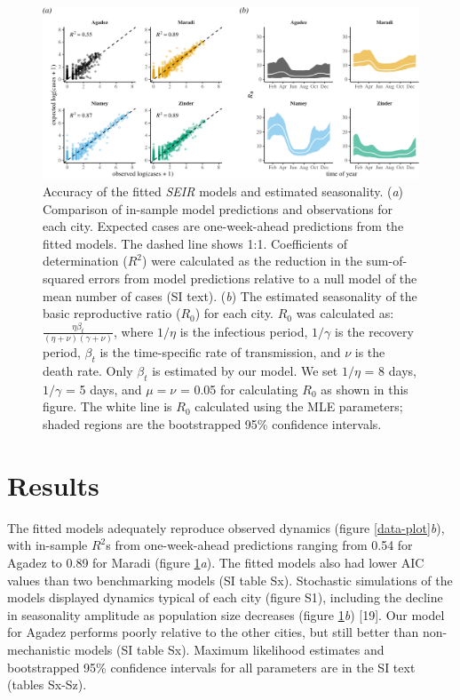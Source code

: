 \documentclass[3p]{elsarticle} %
\makeatletter
\def\maxwidth{\ifdim\Gin@nat@width>\linewidth\linewidth
\else\Gin@nat@width\fi}
\let\Oldincludegraphics\includegraphics
\renewcommand{\includegraphics}[1]{\Oldincludegraphics[width=\maxwidth]{#1}}
\makeatother
\begin{document}
\begin{figure}
\centering
\includegraphics{measles-ews-manuscript_files/figure-latex/scatters-r0-1.pdf}
\caption{Accuracy of the fitted \emph{SEIR} models and estimated
seasonality. (\emph{a}) Comparison of in-sample model predictions and
observations for each city. Expected cases are one-week-ahead
predictions from the fitted models. The dashed line shows 1:1.
Coefficients of determination (\(R^2\)) were calculated as the reduction
in the sum-of-squared errors from model predictions relative to a null
model of the mean number of cases (SI text). (\emph{b}) The estimated
seasonality of the basic reproductive ratio (\(R_0\)) for each city.
\(R_0\) was calculated as:
\(\frac{\eta \beta_t}{(\eta+\nu)(\gamma+\nu)}\), where \(1/\eta\) is the
infectious period, \(1/\gamma\) is the recovery period, \(\beta_t\) is
the time-specific rate of transmission, and \(\nu\) is the death rate.
Only \(\beta_t\) is estimated by our model. We set \(1/\eta\) = 8 days,
\(1/\gamma\) = 5 days, and \(\mu = \nu\) = 0.05 for calculating \(R_0\)
as shown in this figure. The white line is \(R_0\) calculated using the
MLE parameters; shaded regions are the bootstrapped 95\% confidence
intervals. \label{scatters}}
\end{figure}

\hypertarget{results}{%
\section{Results}\label{results}}

The fitted models adequately reproduce observed dynamics (figure
\ref{data-plot}\emph{b}), with in-sample \(R^2\)s from one-week-ahead
predictions ranging from 0.54 for Agadez to 0.89 for Maradi (figure
\ref{scatters}\emph{a}). The fitted models also had lower AIC values
than two benchmarking models (SI table Sx). Stochastic simulations of
the models displayed dynamics typical of each city (figure S1),
including the decline in seasonality amplitude as population size
decreases (figure \ref{scatters}\emph{b}) {[}19{]}. Our model for Agadez
performs poorly relative to the other cities, but still better than
non-mechanistic models (SI table Sx). Maximum likelihood estimates and
bootstrapped 95\% confidence intervals for all parameters are in the SI
text (tables Sx-Sz).
\end{document}
